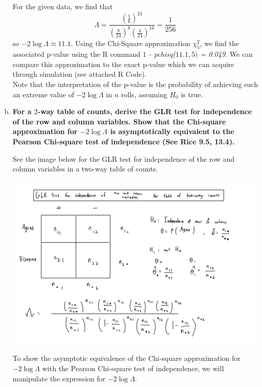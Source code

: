 \begin{enumerate}[a)]
    For the given data, we find that 
    \[
        \Lambda = \frac{\left( \frac{1}{6} \right)^{24} }{\left(\frac{8}{24}\right)^8 \left(\frac{4}{24}\right)^{16}} = \frac{1}{256}
    \]
    so $-2 \log \Lambda \approx 11.1$. Using the Chi-Square approximation $\chi^2_5$, we find the associated p-value using the R command \textit{$1$ - pchisq($11.1, 5)$ = 0.049}.
    We can compare this approximation to the exact p-value which we can acquire through simulation (see attached R Code). \\

    Note that the interpretation of the p-value is the probability of achieving such an extreme value of $-2\log \Lambda$ in $n$ rolls, assuming $H_0$ is true. 

    \newpage
    
    \item \textbf{For a $2$-way table of counts, derive the GLR test for independence of the row and column variables. Show that the Chi-square approximation for $-2 \log \Lambda$ is asymptotically equivalent to the Pearson Chi-square test of independence (See Rice 9.5, 13.4).}
    
     See the image below for the GLR test for independence of the row and column variables in a two-way table of counts.\\
    
    \begin{center}
    \includegraphics[scale=0.25]{week6_c.jpeg}
    \end{center}

    To show the asymptotic equivalence of the Chi-square approximation for $-2 \log \Lambda$ with the Pearson Chi-square test of independence, we will manipulate the expression for $-2 \log \Lambda$. \\
    

\end{enumerate}
